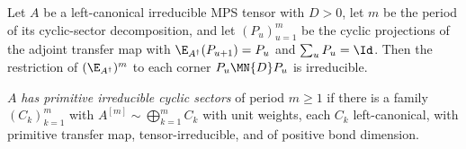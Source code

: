 \begin{lemma}%
    \label{thm:sector_irred_unconditional}
    \leanok
    Let $A$ be a left-canonical irreducible MPS tensor with $D>0$, let $m$ be the
    period of its cyclic-sector decomposition, and let $(P_u)_{u=1}^m$ be the
    cyclic projections of the adjoint transfer map with
    $\E_{A^\dagger}(P_{u+1})=P_u$ and $\sum_uP_u=\Id$. Then the restriction
    of $(\E_{A^\dagger})^m$ to each corner $P_u\MN{D}P_u$ is irreducible.
\end{lemma}


\begin{definition}%
    \label{def:primitive_irreducible_cyclic_sectors}
    \leanok
    $A$ \emph{has primitive irreducible cyclic sectors} of period $m\ge1$ if
    there is a family $(C_k)_{k=1}^m$ with
    $A^{[m]}\sim\bigoplus_{k=1}^mC_k$ with unit weights, each $C_k$
    left-canonical, with primitive transfer map, tensor-irreducible, and of
    positive bond dimension.
\end{definition}
